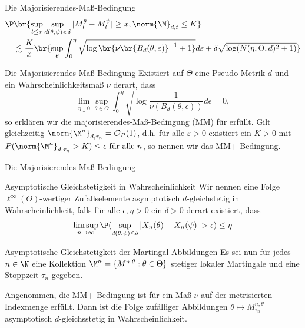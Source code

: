 \begin{frame}{Die Majorisierendes-Maß-Bedingung}
\small
\begin{align*}
            \P&\br{\sup_{t \leq \tau} \sup_{d(\theta, \psi) < \delta} |M_t^\theta - M_t^\psi| \geq x, \norm{\M}_{d,t} \leq K} \\ &\lesssim\frac{K}{x} \br{\sup_\theta \int_0^\eta \sqrt{\log\br{\nu\br{B_d(\theta, \varepsilon)}^{-1} +1 }} d\varepsilon + \delta \sqrt{\log(N(\eta, \Theta, d)^2 +1)}}
        \end{align*}
\normalsize
    \begin{definitionblockname}{Die Majorisierendes-Maß-Bedingung}
        Existiert auf $\Theta$ eine Pseudo-Metrik $d$ und ein Wahrscheinlichkeitsmaß $\nu$ derart, dass \[
\lim_{\eta \downarrow 0} \sup_{\theta \in \Theta} \int_0^\eta \sqrt{\log \frac{1}{\nu(B_d(\theta, \epsilon))}} d\epsilon =0,
        \] so erklären wir die majorisierendes-Maß-Bedingung (MM) für erfüllt. 
        Gilt gleichzeitig $\norm{\M^n}_{d, \tau_n} = \mathcal{O}_P(1)$, d.h. für alle $\varepsilon> 0$ existiert ein $K > 0$ mit $P(\norm{\M^n}_{d, \tau_n} > K) \leq \epsilon \text{ für alle } n$, so nennen wir das MM+-Bedingung.  
    \end{definitionblockname}
\end{frame}

\begin{frame}{Die Majorisierendes-Maß-Bedingung}
\begin{definitionblockname}{Asymptotische Gleichstetigkeit in Wahrscheinlichkeit}
    Wir nennen eine Folge $\ell^\infty(\Theta)$-wertiger Zufallselemente asymptotisch $d$-gleichstetig in Wahrscheinlichkeit, falls für alle $\epsilon, \eta > 0$ ein $\delta > 0$ derart existiert, dass \[
\limsup_{n \to \infty} \P(\sup_{d(\theta, \psi) \leq \delta} |X_n(\theta) - X_n(\psi)| > \epsilon) \leq \eta
    \]
\end{definitionblockname}
    \begin{theoremblockname}{Asymptotische Gleichstetigkeit der Martingal-Abbildungen}
    Es sei nun für jedes $n \in \N$ eine Kollektion $\M^n = \{M^{n, \theta} : \theta \in \Theta\}$ stetiger lokaler Martingale und eine Stoppzeit $\tau_n$ gegeben. 
    
        Angenommen, die MM+-Bedingung ist für ein Maß $\nu$ auf der metrisierten Indexmenge erfüllt. Dann ist die Folge zufälliger Abbildungen $\theta \mapsto M_{\tau_n}^{n,\theta}$ asymptotisch $d$-gleichsstetig in Wahrscheinlichkeit.
    \end{theoremblockname}
\end{frame}